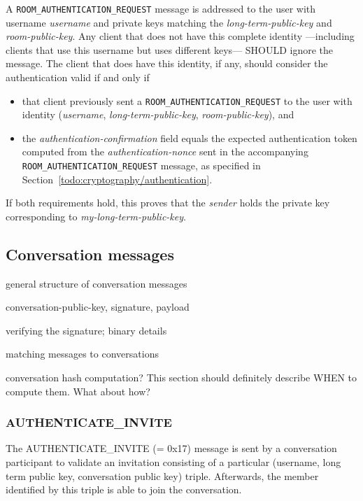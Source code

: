 \documentclass{article}
\def\message#1{\texttt{#1}}
\def\field#1{\textit{#1}}
\begin{document}
A \message{ROOM\_AUTHENTICATION\_REQUEST} message is addressed to the user with username \field{username} and private keys matching the \field{long-term-public-key} and \field{room-public-key}.
Any client that does not have this complete identity ---including clients that use this username but uses different keys--- SHOULD ignore the message.
The client that does have this identity, if any, should consider the authentication valid if and only if
\begin{itemize}
\item that client previously sent a \message{ROOM\_AUTHENTICATION\_REQUEST} to the user with identity (\field{username}, \field{long-term-public-key}, \field{room-public-key}), and
\item the \field{authentication-confirmation} field equals the expected authentication token computed from the \field{authentication-nonce} sent in the accompanying \message{ROOM\_AUTHENTICATION\_REQUEST} message, as specified in Section~\ref{todo:cryptography/authentication}.
\end{itemize}
If both requirements hold, this proves that the \field{sender} holds the private key corresponding to \field{my-long-term-public-key}.


\subsection{Conversation messages}
\label{sec:messages/conversation-messages}

general structure of conversation messages

conversation-public-key, signature, payload

verifying the signature; binary details

matching messages to conversations

conversation hash computation? This section should definitely describe WHEN to compute them. What about how?




\subsubsection{AUTHENTICATE\_INVITE}

The AUTHENTICATE\_INVITE (= 0x17) message is sent by a conversation participant to validate an invitation consisting of a particular (username, long term public key, conversation public key) triple.
Afterwards, the member identified by this triple is able to join the conversation.
\end{document}
